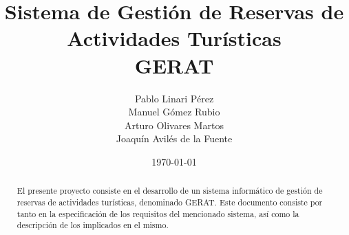 \documentclass[12pt]{article}
\title{Sistema de Gestión de Reservas de Actividades Turísticas\\\textbf{GERAT}}
\author{Pablo Linari Pérez\\Manuel Gómez Rubio\\Arturo Olivares Martos\\Joaquín Avilés de la Fuente}
\date{\today}
\begin{document}
    \begin{comment}
        A la hora de compilar para que se vea el glosario, es más complejo. Lo hace Arturo.
        El PDF no se subirá para que no haya conflictos. Arturo irá subiendo las versiones en _Visible
        Para trabajar, solo toco mi correspondiente archivo, y compilo Practica1.tex como si fuese normal. Y podré ver el PDF
    \end{comment}

    \fancyhead[R]{\helv \nouppercase{\leftmark}}

    \maketitle
    \begin{abstract}
        El presente proyecto consiste en el desarrollo de un sistema informático de gestión de reservas de actividades turísticas, denominado GERAT. Este documento consiste por tanto en la especificación de los requisitos del mencionado sistema, así como la descripción de los implicados en el mismo.
    \end{abstract}

    \tableofcontents

    
    
    
    
    
    

    \newpage
    \glsaddallunused
    \printglossary[numberedsection]
\end{document}
